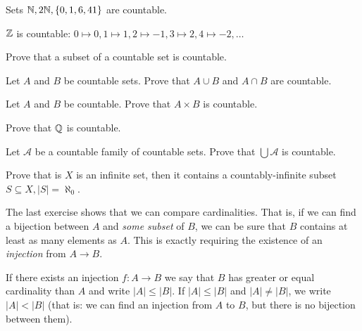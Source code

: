 \begin{example}
  Sets $\mathbb N, 2\mathbb N, \{0,1,6, 41\}$ are countable.
\end{example}

\begin{example}
  $\mathbb Z$ is countable: $0\mapsto 0, 1\mapsto 1, 2\mapsto -1, 3\mapsto 2, 4\mapsto -2,\dots$
\end{example}

\begin{exercise}
  Prove that a subset of a countable set is countable.
\end{exercise}

\begin{exercise}
  Let $A$ and $B$ be countable sets. Prove that $A\cup B$ and $A\cap B$ are countable.
\end{exercise}

\begin{exercise}
  Let $A$ and $B$ be countable. Prove that $A\times B$ is countable. 
\end{exercise}

\begin{exercise}
  Prove that $\mathbb Q$ is countable.
\end{exercise}

\begin{exercise}
  Let $\mathcal A$ be a countable family of countable sets. Prove that $\bigcup \mathcal A$ is countable.
\end{exercise}

\begin{exercise}
  Prove that is $X$ is an infinite set, then it contains a countably-infinite subset $S\subseteq X, |S|=\aleph_0$.
\end{exercise}

The last exercise shows that we can compare cardinalities. That is, if we can find a bijection between $A$ and \textit{some subset} of $B$, we can be sure that $B$ contains at least
as many elements as $A$. This is exactly requiring the existence of an \textit{injection} from $A\to B$.

\begin{definition}
  If there exists an injection $f:A\to B$ we say that $B$ has greater or equal cardinality than $A$ and write $|A|\le |B|$. If $|A|\le |B|$ and $|A|\neq |B|$, we write
  $|A| < |B|$ (that is: we can find an injection from $A$ to $B$, but there is no bijection between them).
\end{definition}

